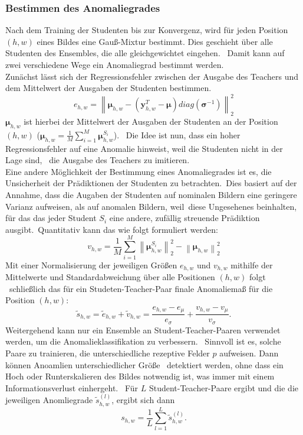 \subsubsection*{Bestimmen des Anomaliegrades}\label{subsubsec:bestimmendesanomaliegradesUninformedStudents}
Nach dem Training der Studenten bis zur Konvergenz, wird für jeden Position $(h,w)$ eines Bildes eine Gauß-Mixtur bestimmt. Dies geschieht über alle Studenten des Ensembles, die alle gleichgewichtet eingehen. \
Damit kann auf zwei verschiedene Wege ein Anomaliegrad bestimmt werden. \\
Zunächst lässt sich der Regressionsfehler zwischen der Ausgabe des Teachers und dem Mittelwert der Ausgaben der Studenten bestimmen. \
$$
e_{h,w} = \left\lVert \boldsymbol{\mu}_{h,w} - \left(\mathbf{y}_{h,w}^{T}-\boldsymbol{\mu}\right)diag\left(\boldsymbol{\sigma}^{-1}\right) \right\rVert_{2}^{2} 
$$
$\boldsymbol{\mu}_{h,w}$ ist hierbei der Mittelwert der Ausgaben der Studenten an der Position $(h,w)$ ($\boldsymbol{\mu}_{h,w}=\frac{1}{M} \sum_{i=1}^M\boldsymbol{\mu}_{h,w}^{S_i}$). \
Die Idee ist nun, dass ein hoher Regressionsfehler auf eine Anomalie hinweist, weil die Studenten nicht in der Lage sind, \
die Ausgabe des Teachers zu imitieren. \\
Eine andere Möglichkeit der Bestimmung eines Anomaliegrades ist es, die Unsicherheit der Prädiktionen der Studenten zu betrachten.\
Dies basiert auf der Annahme, dass die Augaben der Studenten auf nominalen Bildern eine geringere Varianz aufweisen, als auf anomalen Bildern, weil\
diese Ungesehenes beinhalten, für das das jeder Student $S_{i}$ eine andere, zufällig streuende Prädiktion ausgibt.\
Quantitativ kann das wie folgt formuliert werden:\
$$
v_{h,w}=\frac{1}{M} \sum_{i=1}^M\left\|\boldsymbol{\mu}_{h,w}^{S_i}\right\|_2^2-\left\|\boldsymbol{\mu}_{h,w}\right\|_2^2
$$
Mit einer Normalisierung der jeweiligen Größen $e_{h,w}$ und $v_{h,w}$ mithilfe der Mittelwerte und Standardabweichung über alle Positionen $(h,w)$ folgt \
schließlich das für ein Studeten-Teacher-Paar finale Anomaliemaß für die Position $(h,w)$: \
$$
\tilde{s}_{h,w}=\tilde{e}_{h,w}+\tilde{v}_{h,w}=\frac{e_{h,w}-e_\mu}{e_\sigma}+\frac{v_{h,w}-v_\mu}{v_\sigma} .
$$
Weitergehend kann nur ein Ensemble an Student-Teacher-Paaren verwendet werden, um die Anomalieklassifikation zu verbessern. \
Sinnvoll ist es, solche Paare zu trainieren, die unterschiedliche rezeptive Felder $p$ aufweisen. Dann können Anoamlien unterschiedlicher Größe \
detektiert werden, ohne dass ein Hoch oder Runterskalieren des Bildes notwendig ist, was immer mit einem Informationsverlust einhergeht. \
Für $L$ Student-Teacher-Paare ergibt und die die jeweiligen Anomliegrade $\tilde{s}_{h,w}^{(l)}$, ergibt sich dann \
$$
s_{h,w}=\frac{1}{L}\sum_{l=1}^L\tilde{s}_{h,w}^{(l)} .
$$
